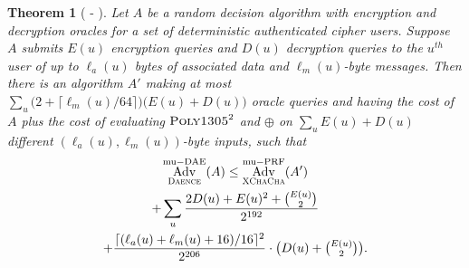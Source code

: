 \documentclass[draft]{article}
\newtheorem{theorem}{Theorem}
\DeclareRobustCommand{\operatorsc}[1]{{%
  \ifmmode\let\next=\operatorname\else\let\next=\relax\fi\next{\textsc{#1}}}}
\def\ChaCha#1/{\operatorsc{ChaCha#1}}
\def\XChaCha#1/{\operatorsc{XChaCha#1}}
\def\Poly#1/{\operatorsc{Poly#1}}
\def\Daence/{\operatorsc{Daence}}
\DeclareMathOperator{\Adv}{Adv}
\DeclareMathOperator{\muDAE}{mu-DAE}
\DeclareMathOperator{\muPRF}{mu-PRF}
\begin{document}
\begin{theorem}[\ChaCha/-\Daence/]\label{thm-chacha-daence}
  Let $A$ be a random decision algorithm with encryption and
   decryption oracles for a set of deterministic authenticated
   cipher users.
  Suppose $A$ submits $E(u)$ encryption queries and $D(u)$ decryption
   queries to the $u^{\mathit{th}}$ user of up to $\ell_a(u)$ bytes of
   associated data and $\ell_m(u)$-byte messages.
  Then there is an algorithm $A'$ making at most
   $\sum_u \bigl(2 + \lceil\ell_m(u)/64\rceil\bigr)
     \bigl(E(u) + D(u)\bigr)$
   oracle queries and having the cost of $A$ plus the cost of
   evaluating $\Poly1305/^2$ and $\oplus$ on
   $\sum_u E(u) + D(u)$
   different $(\ell_a(u), \ell_m(u))$-byte inputs,
   such that
%
  \begin{multline*}
    \Adv^{\muDAE}_{\Daence/}(A)
     \leq \Adv^{\muPRF}_{\XChaCha/}(A') \\
            + \sum_u
                \frac{2 D(u) + E(u)^2 + \binom{E(u)}{2}}
                     {2^{192}} \\
                + \frac{\lceil(\ell_a(u) + \ell_m(u) + 16)/16\rceil^2}{2^{206}}
                  \cdot
                  {\textstyle\bigl(D(u) + \binom{E(u)}{2}\bigr)}.
  \end{multline*}
\end{theorem}



\end{document}
